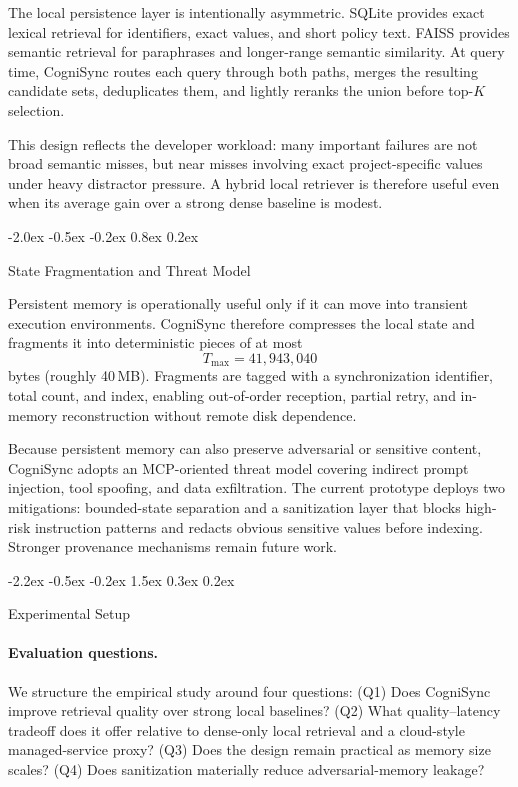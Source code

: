 \documentclass{article}
\makeatletter
\renewcommand{\section}{%
  \@startsection{section}{1}{\z@}%
                {-2.2ex \@plus -0.5ex \@minus -0.2ex}%
                { 1.5ex \@plus  0.3ex \@minus  0.2ex}%
                {\large\bf\raggedright}%
}
\renewcommand{\subsection}{%
  \@startsection{subsection}{2}{\z@}%
                {-2.0ex \@plus -0.5ex \@minus -0.2ex}%
                { 0.8ex \@plus  0.2ex}%
                {\normalsize\bf\raggedright}%
}
\makeatother
\begin{document}
The local persistence layer is intentionally asymmetric. SQLite provides exact lexical retrieval for identifiers, exact values, and short policy text. FAISS provides semantic retrieval for paraphrases and longer-range semantic similarity. At query time, CogniSync routes each query through both paths, merges the resulting candidate sets, deduplicates them, and lightly reranks the union before top-$K$ selection.

This design reflects the developer workload: many important failures are not broad semantic misses, but near misses involving exact project-specific values under heavy distractor pressure. A hybrid local retriever is therefore useful even when its average gain over a strong dense baseline is modest.

\subsection{State Fragmentation and Threat Model}

Persistent memory is operationally useful only if it can move into transient execution environments. CogniSync therefore compresses the local state and fragments it into deterministic pieces of at most
\[
T_{\max}=41{,}943{,}040
\]
bytes (roughly 40\,MB). Fragments are tagged with a synchronization identifier, total count, and index, enabling out-of-order reception, partial retry, and in-memory reconstruction without remote disk dependence.

Because persistent memory can also preserve adversarial or sensitive content, CogniSync adopts an MCP-oriented threat model covering indirect prompt injection, tool spoofing, and data exfiltration. The current prototype deploys two mitigations: bounded-state separation and a sanitization layer that blocks high-risk instruction patterns and redacts obvious sensitive values before indexing. Stronger provenance mechanisms remain future work.

\section{Experimental Setup}

\paragraph{Evaluation questions.}
We structure the empirical study around four questions: (Q1) Does CogniSync improve retrieval quality over strong local baselines? (Q2) What quality--latency tradeoff does it offer relative to dense-only local retrieval and a cloud-style managed-service proxy? (Q3) Does the design remain practical as memory size scales? (Q4) Does sanitization materially reduce adversarial-memory leakage?
\end{document}
